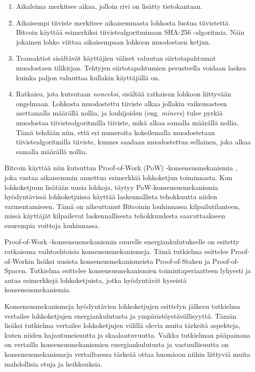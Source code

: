 \begin{enumerate}
\item Aikaleima merkitsee aikaa, jolloin rivi on lisätty tietokantaan.
\item Aikaisempi tiiviste merkitsee aikaisemmasta lohkosta luotua tiivistettä. Bitcoin käyttää esimerkiksi tiivistealgoritminaan SHA-256 -algoritmia. Näin jokainen lohko viittaa aikaisempaan lohkoon muodostaen ketjun.
\item Transaktiot sisältävät käyttäjien väliset valuutan siirtotapahtumat muodostaen tilikirjan. Tehtyjen siirtotapahtumien perusteella voidaan laskea kuinka paljon valuuttaa kullakin käyttäjällä on.
\item Ratkaisu, jota kutsutaan \textit{nonceksi}, sisältää ratkaisun lohkoon liittyvään ongelmaan. Lohkosta muodostettu tiiviste alkaa jollakin vaikeusasteen asettamalla määrällä nollia, ja louhijoiden (eng. \textit{miners}) tulee pyrkiä muodostaa tiivistealgoritmilla tiiviste, mikä alkaa samalla määrällä nollia. Tämä tehdään niin, että eri numeroita kokeilemalla muodostetaan tiivistealgoritmilla tiiviste, kunnes saadaan muodostettua sellainen, joka alkaa samalla määrällä nollia.
\end{enumerate}

Bitcoin käyttää niin kutsuttua Proof-of-Work (PoW) -konsensusmekanismia \cite{satoshibitcoin}, joka vastaa aikaisemmin annettua esimerkkiä lohkoketjun toiminnasta. Kun lohkoketjuun lisätään uusia lohkoja, täytyy PoW-konsensusmekanismia hyödyntävissä lohkoketjuissa käyttää laskennallista tehokkuutta niiden varmentamiseen. Tämä on aiheuttanut Bitcoinin louhinnassa kilpailutilanteen, missä käyttäjät kilpailevat laskennallisesta tehokkuudesta saavuttaakseen suurempia voittoja louhinnassa.

Proof-of-Work -konsensusmekanismin suurelle energiankulutukselle on esitetty ratkaisuna vaihtoehtoisia konsensusmekanismeja. Tämä tutkielma esittelee Proof-of-Workin lisäksi uusista konsensusmekanismeista Proof-of-Staken ja Proof-of-Spacen. Tutkielma esittelee konsensusmekanismien toimintaperiaatteen lyhyesti ja antaa esimerkkejä lohkoketjuista, jotka hyödyntävät kyseistä konsensusmekanismia.

Konsensusmekanismeja hyödyntävien lohkoketjujen esittelyn jälkeen tutkielma vertailee lohkoketjujen energiankulutusta ja ympäristöystävällisyyttä. Tämän lisäksi tutkielma vertailee lohkoketjujen välillä olevia muita tärkeitä aspekteja, kuten niiden hajautuneisuutta ja skaalautuvuutta. Vaikka tutkielman pääpainona on vertailla konsensusmekanismien energiankulutusta ja vastuullisuutta on konsensusmekanismeja vertailtaessa tärkeää ottaa huomioon niihin liittyviä muita mahdollisia etuja ja heikkouksia.
